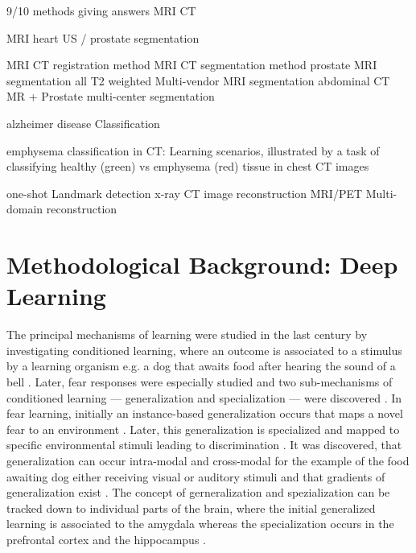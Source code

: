         9/10 methods giving answers MRI CT


        \citep{zhang2020generalizing} MRI heart US / prostate segmentation

        \citep{siebert2021fast} MRI CT registration method
        \citep{ouyang2022causality} MRI CT segmentation method
        \citep{liu2020shape} prostate MRI segmentation all T2 weighted
        \citep{huang2022online} Multi-vendor MRI segmentation
        \citep{gao2024desam} abdominal CT MR + Prostate multi-center segmentation

        \citep{wang2021harmonization} alzheimer disease Classification

        \citep{cheplygina2019not} emphysema classification in CT: Learning scenarios, illustrated by a task of classifying healthy (green) vs emphysema (red) tissue in chest CT images

        \citep{zhu2023uod} one-shot Landmark detection x-ray
        CT image reconstruction \citep{choi2023ct}
        MRI/PET Multi-domain reconstruction \citep{gautier2024bimodal}



\section{Methodological Background: Deep Learning} %
    The principal mechanisms of learning were studied in the last century by investigating conditioned learning, where an outcome is associated to a stimulus by a learning organism e.g. a dog that awaits food after hearing the sound of a bell \citep{pavlov1928conditioned, pavlov2010conditioned, banich2011generalization}. Later, fear responses were especially studied and two sub-mechanisms of conditioned learning --- generalization and specialization --- were discovered \citep{banich2011generalization}.
    In fear learning, initially an instance-based generalization occurs that maps a novel fear to an environment \citep{banich2011generalization}. Later, this generalization is specialized and mapped to specific environmental stimuli leading to discrimination \citep{banich2011generalization}.
    It was discovered, that generalization can occur intra-modal and cross-modal for the example of the food awaiting dog either receiving visual or auditory stimuli \citep{pavlov1928conditioned} and that gradients of generalization exist \citep{guttman1956discriminability}.
    The concept of gerneralization and spezialization can be tracked down to individual parts of the brain, where the initial generalized learning is associated to the amygdala whereas the specialization occurs in the prefrontal cortex and the hippocampus \citep{banich2011generalization}.

